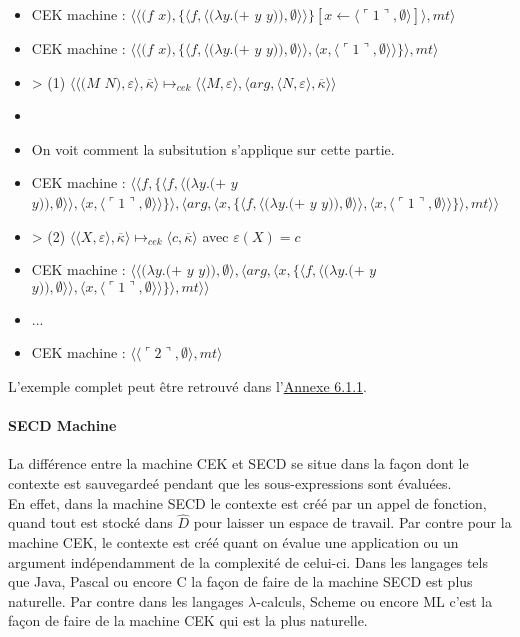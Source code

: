 \documentclass[10pt,a4paper]{article}
\begin{document}
\begin{itemize}
					\item[] CEK machine : $\langle\langle(f$ $x),\{\langle f,\langle(\lambda y.(+$ $y$ $y)),\emptyset\rangle\rangle\}[x \leftarrow \langle\ulcorner 1\urcorner,\emptyset\rangle]\rangle,mt\rangle$
					\item[] CEK machine : $\langle\langle(f$ $x),\{\langle f,\langle(\lambda y.(+$ $y$ $y)),\emptyset\rangle\rangle,\langle x,\langle\ulcorner 1\urcorner,\emptyset\rangle\rangle\}\rangle,mt\rangle$
					\item[] > (1) $\langle\langle(M$ $N),\varepsilon\rangle,\overline{\kappa}\rangle \longmapsto_{cek} \langle \langle M,\varepsilon\rangle,\langle arg,\langle N,\varepsilon\rangle,\overline{\kappa}\rangle\rangle$
					\item[]
					\item[] On voit comment la subsitution s'applique sur cette partie.
					\item[] CEK machine : $\langle\langle f,\{\langle f,\langle(\lambda y.(+$ $y$ $y)),\emptyset\rangle\rangle,\langle x,\langle\ulcorner 1\urcorner,\emptyset\rangle\rangle\}\rangle,\langle arg,\langle x,\{\langle f,\langle(\lambda y.(+$ $y$ $y)),\emptyset\rangle\rangle,\langle x,\langle\ulcorner 1\urcorner,\emptyset\rangle\rangle\}\rangle,mt\rangle\rangle$
					\item[] > (2) $\langle\langle X,\varepsilon\rangle,\overline{\kappa}\rangle \longmapsto_{cek} \langle c,\overline{\kappa}\rangle$ avec $\varepsilon(X) = c$
					\item[] CEK machine : $\langle\langle(\lambda y.(+$ $y$ $y)),\emptyset\rangle,\langle arg,\langle x,\{\langle f,\langle(\lambda y.(+$ $y$ $y)),\emptyset\rangle\rangle,\langle x,\langle\ulcorner 1\urcorner,\emptyset\rangle\rangle\}\rangle,mt\rangle\rangle$
					\item[] ...
					\item[] CEK machine : $\langle\langle\ulcorner 2\urcorner,\emptyset\rangle,mt\rangle$
				\end{itemize}
				\medbreak
				
				L'exemple complet peut être retrouvé dans l'\hyperref[CEK]{Annexe 6.1.1}.
				\bigbreak
				
			
			\paragraph{SECD Machine}
			
				La différence entre la machine CEK et SECD se situe dans la façon dont le contexte est sauvegardeé pendant que les sous-expressions sont évaluées.\\
				En effet, dans la machine SECD le contexte est créé par un appel de fonction, quand tout est stocké dans $\widehat{D}$ pour laisser un espace de travail. Par contre pour la machine CEK, le contexte est créé quant on évalue une application ou un argument indépendamment de la complexité de celui-ci.
				\smallbreak 
				Dans les langages tels que Java, Pascal ou encore C la façon de faire de la machine SECD est plus naturelle. Par contre  dans les langages $\lambda$-calculs, Scheme ou encore ML c'est la façon de faire de la machine CEK qui est la plus naturelle.
				\medbreak
				
\end{document}
